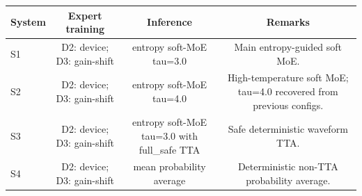 \begin{tabular}{lccc}
\toprule
System & Expert training & Inference & Remarks \\
\midrule
S1 & D2: device; D3: gain-shift & entropy soft-MoE tau=3.0 & Main entropy-guided soft MoE. \\
S2 & D2: device; D3: gain-shift & entropy soft-MoE tau=4.0 & High-temperature soft MoE; tau=4.0 recovered from previous configs. \\
S3 & D2: device; D3: gain-shift & entropy soft-MoE tau=3.0 with full_safe TTA & Safe deterministic waveform TTA. \\
S4 & D2: device; D3: gain-shift & mean probability average & Deterministic non-TTA probability average. \\
\bottomrule
\end{tabular}
